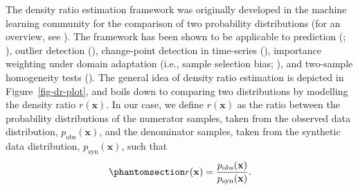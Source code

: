 \documentclass[
]{article}
\newcommand{\pobs}{p_{\text{obs}}}
\newcommand{\psyn}{p_{\text{syn}}}
\newcommand{\bx}{\mathbf{x}}
\begin{document}
The density ratio estimation framework was originally developed in the
machine learning community for the comparison of two probability
distributions (for an overview, see
). The framework has been shown to be applicable to
prediction (; ),
outlier detection (), change-point detection in time-series
(), importance weighting
under domain adaptation (i.e., sample selection bias;
),
and two-sample homogeneity tests
(). The
general idea of density ratio estimation is depicted in
Figure~\ref{fig-dr-plot}, and boils down to comparing two distributions
by modelling the density ratio \(r(\bx)\). In our case, we define
\(r(\bx)\) as the ratio between the probability distributions of the
numerator samples, taken from the observed data distribution,
\(\pobs(\bx)\), and the denominator samples, taken from the synthetic
data distribution, \(\psyn(\bx)\), such that
\begin{equation}\phantomsection\label{eq-dr}{
r(\bx) = \frac{\pobs(\bx)}{\psyn(\bx)}.
}\end{equation}
\end{document}
